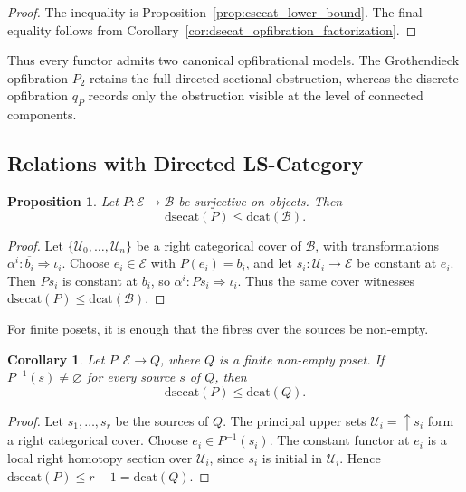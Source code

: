 \documentclass[12pt]{amsart}
\newtheorem{corollary}[teo]{Corollary}
\newtheorem{prop}[teo]{Proposition}
\theoremstyle{definition}
\theoremstyle{remark}
\numberwithin{figure}{section}%
\newcommand{\Ba}{\mathcal{B}}
\newcommand{\E}{\mathcal{E}}
\newcommand{\Uc}{\mathcal{U}}
\begin{document}
\begin{proof}
The inequality is
Proposition~\ref{prop:csecat_lower_bound}. The final equality follows from
Corollary~\ref{cor:dsecat_opfibration_factorization}.
\end{proof}

Thus every functor admits two canonical opfibrational models. The
Grothendieck opfibration \(P_2\) retains the full directed sectional
obstruction, whereas the discrete opfibration \(q_P\) records only the
obstruction visible at the level of connected components. 

\subsection{Relations with Directed LS-Category}

\begin{prop}\label{inequality_genus_LS}
Let \(P\colon\E\to\Ba\) be surjective on objects. Then
\[
\mathrm{dsecat}(P)\leq\mathrm{dcat}(\Ba).
\]
\end{prop}

\begin{proof}
Let \(\{\Uc_0,\ldots,\Uc_n\}\) be a right categorical cover of \(\Ba\),
with transformations
\(\alpha^i\colon\overline{b_i}\Rightarrow\iota_i\).
Choose \(e_i\in\E\) with \(P(e_i)=b_i\), and let
\(s_i\colon\Uc_i\to\E\) be constant at \(e_i\). Then \(Ps_i\) is constant
at \(b_i\), so \(\alpha^i\colon Ps_i\Rightarrow\iota_i\). Thus the same
cover witnesses \(\mathrm{dsecat}(P)\leq\mathrm{dcat}(\Ba)\).
\end{proof}

For finite posets, it is enough that the fibres over the sources be
non-empty.

\begin{corollary}\label{cor:dsecat_poset_sources}
Let \(P\colon\E\to Q\), where \(Q\) is a finite non-empty poset. If
\(P^{-1}(s)\neq\varnothing\) for every source \(s\) of \(Q\), then
\[
\mathrm{dsecat}(P)\leq\mathrm{dcat}(Q).
\]
\end{corollary}

\begin{proof}
Let \(s_1,\ldots,s_r\) be the sources of \(Q\). The principal upper sets
\(\Uc_i=\uparrow s_i\) form a right categorical cover. Choose
\(e_i\in P^{-1}(s_i)\). The constant functor at \(e_i\) is a local right
homotopy section over \(\Uc_i\), since \(s_i\) is initial in \(\Uc_i\).
Hence \(\mathrm{dsecat}(P)\leq r-1=\mathrm{dcat}(Q)\).
\end{proof}
\end{document}
